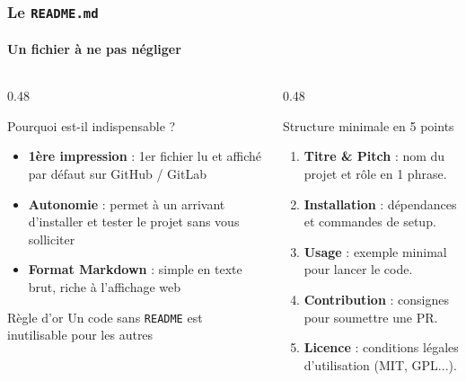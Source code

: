 \documentclass[
	11pt,
	aspectratio=169
]{beamer}
\begin{document}
\begin{frame}
    \frametitle{Le \texttt{README.md}}
    \framesubtitle{Un fichier à ne pas négliger}

    \begin{columns}[t]
        \begin{column}{0.48\textwidth}
            \begin{block}{\footnotesize Pourquoi est-il indispensable ?}
                \scriptsize
                \begin{itemize}
                    \item \textbf{1ère impression} : 1er fichier lu et affiché par défaut sur GitHub / GitLab
                    \item \textbf{Autonomie} : permet à un arrivant d'installer et tester le projet sans vous solliciter
                    \item \textbf{Format Markdown} : simple en texte brut, riche à l'affichage web
                \end{itemize}
            \end{block}

            \vskip 2pt
            \begin{alertblock}{\centering \scriptsize Règle d'or}
                \centering \scriptsize
                Un code sans \texttt{README} est inutilisable pour les autres
            \end{alertblock}
        \end{column}

        \begin{column}{0.48\textwidth}
            \begin{exampleblock}{\footnotesize Structure minimale en 5 points}
                \scriptsize
                \begin{enumerate}
                    \item \textbf{Titre \& Pitch} : nom du projet et rôle en 1 phrase.
                    \item \textbf{Installation} : dépendances et commandes de setup.
                    \item \textbf{Usage} : exemple minimal pour lancer le code.
                    \item \textbf{Contribution} : consignes pour soumettre une PR.
                    \item \textbf{Licence} : conditions légales d'utilisation (MIT, GPL...).
                \end{enumerate}
            \end{exampleblock}
        \end{column}
    \end{columns}
\end{frame}
\end{document}
